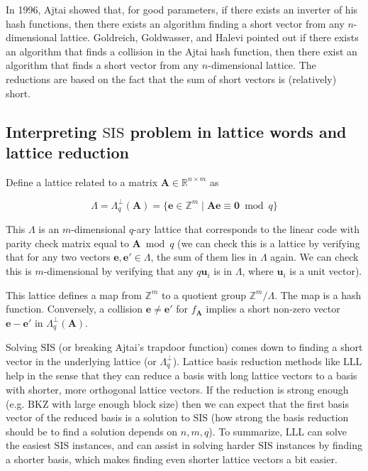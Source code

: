 In 1996, Ajtai showed that, for good parameters, if there exists an inverter of his hash functions, then there exists an algorithm finding a short vector from any $n$-dimensional lattice. Goldreich, Goldwasser, and Halevi pointed out if there exists an algorithm that finds a collision in the Ajtai hash function, then there exist an algorithm that finds a short vector from any $n$-dimensional lattice. The reductions are based on the fact that the sum of short vectors is (relatively) short.

\subsection{Interpreting \texorpdfstring{$\mathrm{SIS}$}{SIS} problem in lattice words and lattice reduction}
Define a lattice related to a matrix $\textbf{A}\in \mathbb{R}^{n \times m}$ as

\[\Lambda = \Lambda_q^{\perp}({\textbf{A}}) = \{\textbf{e} \in \mathbb{Z}^m \mid {\textbf{A}} \textbf{e} \equiv \textbf{0} \bmod{q}\}\]

This $\Lambda$ is an $m$-dimensional $q$-ary lattice that corresponds to the linear code with parity check matrix equal to $\textbf{A} \bmod q$ (we can check this is a lattice by verifying that for any two vectors $\textbf{e}, \textbf{e}' \in \Lambda$, the sum of them lies in $\Lambda$ again. We can check this is $m$-dimensional by verifying that any $q \textbf{u}_i$ is in $\Lambda$, where $\textbf{u}_i$ is a unit vector).

This lattice defines a map from $\mathbb{Z}^m$ to a quotient group $\mathbb{Z}^m/\Lambda$. The map is a hash function. Conversely, a collision $\textbf{e} \neq \textbf{e}'$ for $f_{\textbf{A}}$ implies a short non-zero vector $\textbf{e}-\textbf{e}'$ in $\Lambda_q^{\perp}({\textbf{A}})$.


Solving $\mathrm{SIS}$ (or breaking Ajtai's trapdoor function) comes down to finding a short vector in the underlying lattice (or $\Lambda_q^{\perp}$). Lattice basis reduction methods like $\mathrm{LLL}$ help in the sense that they can reduce a basis with long lattice vectors to a basis with shorter, more orthogonal lattice vectors. If the reduction is strong enough (e.g. $\mathrm{BKZ}$ with large enough block size) then we can expect that the first basis vector of the reduced basis is a solution to $\mathrm{SIS}$ (how strong the basis reduction should be to find a solution depends on $n, m, q$). To summarize, $\mathrm{LLL}$ can solve the easiest $\mathrm{SIS}$ instances, and can assist in solving harder $\mathrm{SIS}$ instances by finding a shorter basis, which makes finding even shorter lattice vectors a bit easier.


